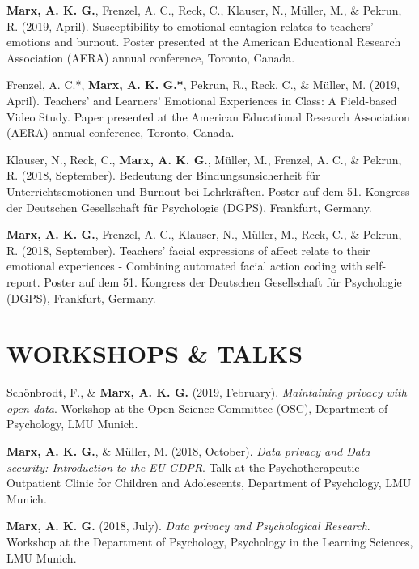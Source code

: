 \documentclass[letterpaper]{article}
\renewenvironment{itemize}{ %
  \begin{list}{}{ %
    \setlength{\leftmargin}{2.5em} %
  }
}{
  \end{list}
}
\begin{document}
\begin{itemize}
\item {\bf Marx, A. K. G.}, Frenzel, A. C., Reck, C., Klauser, N., Müller, M., \& Pekrun, R. (2019, April). Susceptibility to emotional contagion relates to teachers' emotions and burnout. Poster presented at the American Educational Research Association (AERA) annual conference, Toronto, Canada.
\item Frenzel, A. C.*, {\bf Marx, A. K. G.*}, Pekrun, R., Reck, C., \& Müller, M. (2019, April). Teachers’ and Learners’ Emotional Experiences in Class: A Field-based Video Study. Paper presented at the American Educational Research Association (AERA) annual conference, Toronto, Canada.
\item Klauser, N., Reck, C., {\bf Marx, A. K. G.}, Müller, M., Frenzel, A. C., \& Pekrun, R. (2018, September). Bedeutung der Bindungsunsicherheit für Unterrichtsemotionen und Burnout bei Lehrkräften. Poster auf dem 51. Kongress der Deutschen Gesellschaft für Psychologie (DGPS), Frankfurt, Germany.
\item {\bf Marx, A. K. G.}, Frenzel, A. C., Klauser, N., Müller, M., Reck, C., \& Pekrun, R. (2018, September). Teachers' facial expressions of affect relate to their emotional experiences - Combining automated facial action coding with self-report. Poster auf dem 51. Kongress der Deutschen Gesellschaft für Psychologie (DGPS), Frankfurt, Germany.
\item{}
\end{itemize}


\section*{WORKSHOPS \& TALKS}
\begin{itemize}
\item Schönbrodt, F., \& {\bf Marx, A. K. G.} (2019, February). {\it Maintaining privacy with open data}. Workshop at the Open-Science-Committee (OSC), Department of Psychology, LMU Munich.
\item {\bf Marx, A. K. G.}, \& Müller, M. (2018, October). {\it Data privacy and Data security: Introduction to the EU-GDPR}. Talk at the Psychotherapeutic Outpatient Clinic for Children and Adolescents, Department of Psychology, LMU Munich.
\item {\bf Marx, A. K. G.} (2018, July). {\it Data privacy and Psychological Research}. Workshop at the Department of Psychology, Psychology in the Learning Sciences, LMU Munich.
\end{itemize}
\end{document}

